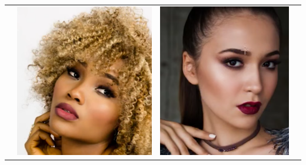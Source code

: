 \begin{longtable}{|N||c|c|c|}
\begin{minipage}{.29\textwidth}
  \end{minipage} \\
    \hline  \label{row:photoshop_match_other_2} &
  \begin{minipage}{.29\textwidth}
    \includegraphics[width=\textwidth,height=\textheight,keepaspectratio]{images/match_other_2_orig}
  \end{minipage} & 
  \begin{minipage}{.29\textwidth}
    \includegraphics[width=\textwidth,height=\textheight,keepaspectratio]{images/match_other_2_targ}

\end{minipage}
\end{longtable}
